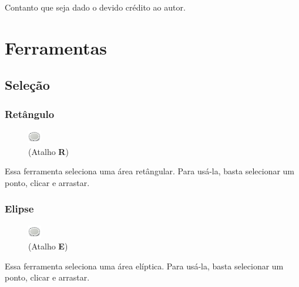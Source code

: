 \documentclass[12pt,onecolumn]{article}
\begin{document}
    Contanto que seja dado o devido crédito ao autor.
    
\clearpage
\section{Ferramentas}

  \subsection{Seleção}
    \subsubsection{Retângulo}
      \begin{figure}
        \vspace{-35pt}
        \begin{center}
          \includegraphics{gimp-icons/stock-tool-ellipse-select-22.png} \\
          (Atalho {\bf R})
        \end{center}
        \label{fig:rectselect}
        \vspace{-20pt}
      \end{figure}
      Essa ferramenta seleciona uma área retângular. Para usá-la, basta selecionar um ponto,
      clicar e arrastar.

      \subsubsection{Elipse}
      \begin{figure}
        \vspace{-35pt}
        \begin{center}
          \includegraphics{gimp-icons/stock-tool-ellipse-select-22.png} \\
          (Atalho {\bf E})
        \end{center}
        \label{fig:ellipseselect}
        \vspace{-20pt}
      \end{figure}
      Essa ferramenta seleciona uma área elíptica. Para usá-la, basta selecionar um ponto,
      clicar e arrastar.
\end{document}
